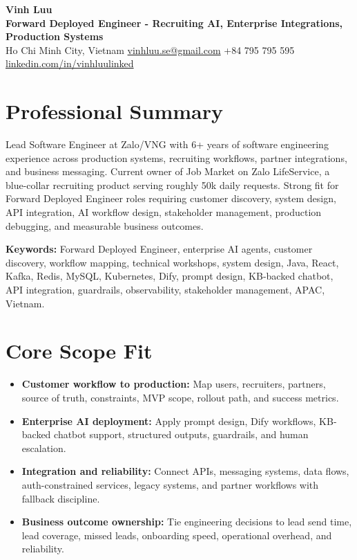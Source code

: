 \documentclass[10pt,letterpaper]{article}
\begin{document}
{\LARGE\textbf{Vinh Luu}}\\
{\color{headingblue}\textbf{Forward Deployed Engineer - Recruiting AI, Enterprise Integrations, Production Systems}}\\
Ho Chi Minh City, Vietnam \textbar{}
\href{mailto:vinhluu.se@gmail.com}{vinhluu.se@gmail.com} \textbar{}
+84 795 795 595 \textbar{}
\href{https://www.linkedin.com/in/vinhluulinked/}{linkedin.com/in/vinhluulinked}

\section*{Professional Summary}
Lead Software Engineer at Zalo/VNG with 6+ years of software engineering experience across production systems, recruiting workflows, partner integrations, and business messaging. Current owner of Job Market on Zalo LifeService, a blue-collar recruiting product serving roughly 50k daily requests. Strong fit for Forward Deployed Engineer roles requiring customer discovery, system design, API integration, AI workflow design, stakeholder management, production debugging, and measurable business outcomes.

\textbf{Keywords:} Forward Deployed Engineer, enterprise AI agents, customer discovery, workflow mapping, technical workshops, system design, Java, React, Kafka, Redis, MySQL, Kubernetes, Dify, prompt design, KB-backed chatbot, API integration, guardrails, observability, stakeholder management, APAC, Vietnam.

\section*{Core Scope Fit}
\begin{itemize}
  \item \textbf{Customer workflow to production:} Map users, recruiters, partners, source of truth, constraints, MVP scope, rollout path, and success metrics.
  \item \textbf{Enterprise AI deployment:} Apply prompt design, Dify workflows, KB-backed chatbot support, structured outputs, guardrails, and human escalation.
  \item \textbf{Integration and reliability:} Connect APIs, messaging systems, data flows, auth-constrained services, legacy systems, and partner workflows with fallback discipline.
  \item \textbf{Business outcome ownership:} Tie engineering decisions to lead send time, lead coverage, missed leads, onboarding speed, operational overhead, and reliability.
\end{itemize}
\end{document}
